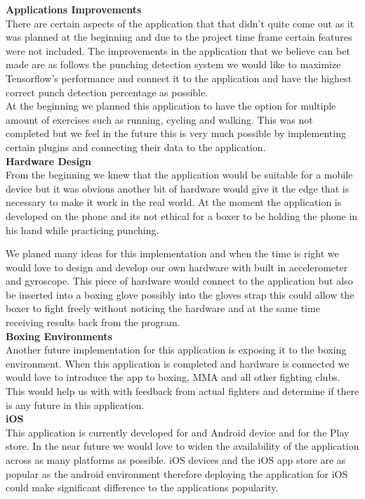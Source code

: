 \documentclass[a4paper,12pt]{report}
\begin{document}
\textbf{Applications Improvements}\\
There are certain aspects of the application that that didn't quite come out as it was planned at the beginning and due to the project time frame certain features were not included.
The improvements in the application that we believe can bet made are as follows the punching detection system we would like to maximize Tensorflow's performance and connect it to the application and have the highest correct punch detection percentage as possible.\\
At the beginning we planned this application to have the option for multiple amount of exercises such as running, cycling and walking. This was not completed but we feel in the future this is very much possible by implementing certain plugins and connecting their data to the application.\\  


\textbf{Hardware Design}\\
From the beginning we knew that the application would be suitable for a mobile device but it was obvious another bit of hardware would give it the edge that is necessary to make it work in the real world.
At the moment the application is developed on the phone and its not ethical for a boxer to be holding the phone in his hand while practicing punching.

We planed many ideas for this implementation and when the time is right we would love to design and develop our own hardware with built in accelerometer and gyroscope.
This piece of hardware would connect to the application but also be inserted into a boxing glove possibly into the gloves strap this could allow the boxer to fight freely without noticing the hardware and at the same time receiving results back from the program.\\

\textbf{Boxing Environments}\\
Another future implementation for this application is exposing it to the boxing environment. When this application is completed and hardware is connected we would love to introduce the app to boxing, MMA and all other fighting clubs.
This would help us with with feedback from actual fighters and determine if there is any future in this application.\\

\textbf{iOS}\\
This application is currently developed for and Android device and for the Play store. In the near future we would love to widen the availability of the application across as many platforms as possible.
iOS devices and the iOS app store are as popular as the android environment therefore deploying the application for iOS could make significant difference to the applications popularity.
\end{document}
